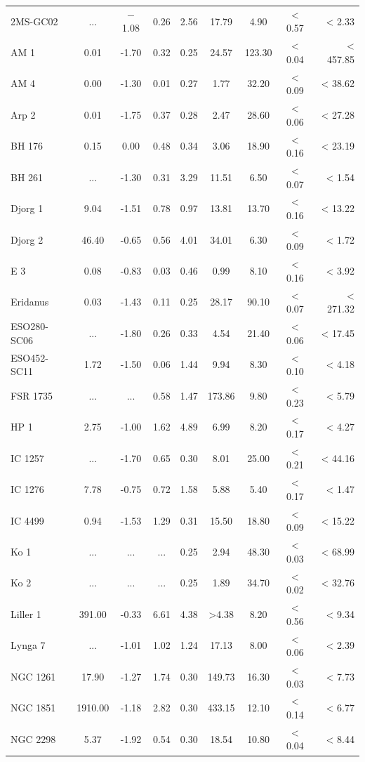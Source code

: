 \documentclass[doublespace,nopageskip]{VTthesis} %
\begin{document}
\begin{appendices}
\begin{center}
\begin{longtable}{lcccccccr}
2MS-GC02 & ... & $-$1.08 & 0.26 & 2.56 & 17.79 & 4.90 & < 0.57 & < 2.33\\
AM 1 & 0.01 & -1.70 & 0.32 & 0.25 & 24.57 & 123.30 & < 0.04 & < 457.85\\
AM 4 & 0.00 & -1.30 & 0.01 & 0.27 & 1.77 & 32.20 & < 0.09 & < 38.62\\
Arp 2 & 0.01 & -1.75 & 0.37 & 0.28 & 2.47 & 28.60 & < 0.06 & < 27.28\\
BH 176 & 0.15 & 0.00 & 0.48 & 0.34 & 3.06 & 18.90 & < 0.16 & < 23.19\\
BH 261 & ... & -1.30 & 0.31 & 3.29 & 11.51 & 6.50 & < 0.07 & < 1.54\\
Djorg 1 & 9.04 & -1.51 & 0.78 & 0.97 & 13.81 & 13.70 & < 0.16 & < 13.22\\
Djorg 2 & 46.40 & -0.65 & 0.56 & 4.01 & 34.01 & 6.30 & < 0.09 & < 1.72\\
E 3 & 0.08 & -0.83 & 0.03 & 0.46 & 0.99 & 8.10 & < 0.16 & < 3.92\\
Eridanus & 0.03 & -1.43 & 0.11 & 0.25 & 28.17 & 90.10 & < 0.07 & < 271.32\\
ESO280-SC06 & ... & -1.80 & 0.26 & 0.33 & 4.54 & 21.40 & < 0.06 & < 17.45\\
ESO452-SC11 & 1.72 & -1.50 & 0.06 & 1.44 & 9.94 & 8.30 & < 0.10 & < 4.18\\
FSR 1735 & ... & ... & 0.58 & 1.47 & 173.86 & 9.80 & < 0.23 & < 5.79\\
HP 1 & 2.75 & -1.00 & 1.62 & 4.89 & 6.99 & 8.20 & < 0.17 & < 4.27\\
IC 1257 & ... & -1.70 & 0.65 & 0.30 & 8.01 & 25.00 & < 0.21 & < 44.16\\
IC 1276 & 7.78 & -0.75 & 0.72 & 1.58 & 5.88 & 5.40 & < 0.17 & < 1.47\\
IC 4499 & 0.94 & -1.53 & 1.29 & 0.31 & 15.50 & 18.80 & < 0.09 & < 15.22\\
Ko 1 & ... & ... & ... & 0.25 & 2.94 & 48.30 & < 0.03 & < 68.99\\
Ko 2 & ... & ... & ... & 0.25 & 1.89 & 34.70 & < 0.02 & < 32.76\\
Liller 1 & 391.00 & -0.33 & 6.61 & 4.38 & >4.38 & 8.20 & < 0.56 & < 9.34\\
Lynga 7 & ... & -1.01 & 1.02 & 1.24 & 17.13 & 8.00 & < 0.06 & < 2.39\\
NGC 1261 & 17.90 & -1.27 & 1.74 & 0.30 & 149.73 & 16.30 & < 0.03 & < 7.73\\
NGC 1851 & 1910.00 & -1.18 & 2.82 & 0.30 & 433.15 & 12.10 & < 0.14 & < 6.77\\
NGC 2298 & 5.37 & -1.92 & 0.54 & 0.30 & 18.54 & 10.80 & < 0.04 & < 8.44\\

\end{longtable}
\end{center}
\end{appendices}
\end{document}
